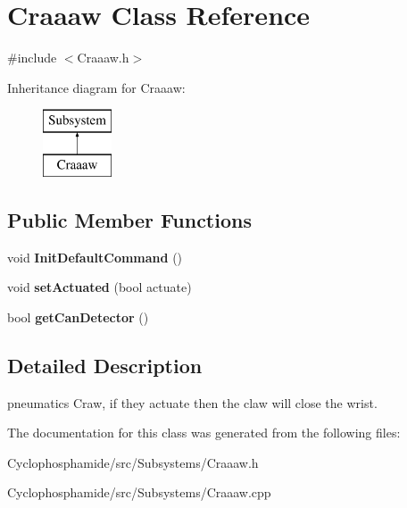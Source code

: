 \hypertarget{class_craaaw}{}\section{Craaaw Class Reference}
\label{class_craaaw}


{\ttfamily \#include $<$Craaaw.\+h$>$}

Inheritance diagram for Craaaw\+:\begin{figure}[H]
\begin{center}
\leavevmode
\includegraphics[height=2.000000cm]{class_craaaw}
\end{center}
\end{figure}
\subsection*{Public Member Functions}
\begin{DoxyCompactItemize}
\item 
\hypertarget{class_craaaw_ac6c9fcc66d7f9774d3f3c197f486beac}{}void {\bfseries Init\+Default\+Command} ()\label{class_craaaw_ac6c9fcc66d7f9774d3f3c197f486beac}

\item 
\hypertarget{class_craaaw_a136325b9f3185faddfa4c52961114986}{}void {\bfseries set\+Actuated} (bool actuate)\label{class_craaaw_a136325b9f3185faddfa4c52961114986}

\item 
\hypertarget{class_craaaw_a11298c00a8397de8f85ad638c6b9bea0}{}bool {\bfseries get\+Can\+Detector} ()\label{class_craaaw_a11298c00a8397de8f85ad638c6b9bea0}

\end{DoxyCompactItemize}


\subsection{Detailed Description}
pneumatics Craw, if they actuate then the claw will close the wrist. 

The documentation for this class was generated from the following files\+:\begin{DoxyCompactItemize}
\item 
Cyclophosphamide/src/\+Subsystems/Craaaw.\+h\item 
Cyclophosphamide/src/\+Subsystems/Craaaw.\+cpp\end{DoxyCompactItemize}

